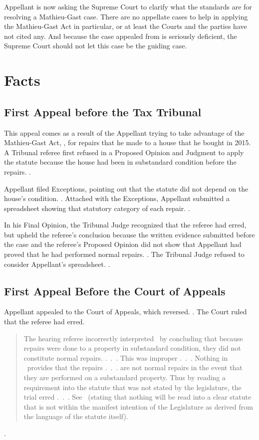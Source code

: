 \documentclass[12pt,\documentclassflag]{michiganCourtOfAppealsBrief}
\begin{document}
Appellant is now asking the Supreme Court to clarify what the standards are for resolving a Mathieu-Gast case. There are no  appellate cases to help in applying the Mathieu-Gast Act in particular, or at least the Courts and the parties have not cited any. And because the case appealed from is seriously deficient, the Supreme Court should not let this case be the guiding case.

\section{Facts}

\subsection{First Appeal before the Tax Tribunal}

This appeal comes as a result of the Appellant trying to take advantage of the Mathieu-Gast Act, \mathieuGast,
for repairs that he made to a house that he bought in 2015. A Tribunal referee first refused in a Proposed Opinion and Judgment to apply the statute because the house had been in substandard condition before the repairs. .

Appellant filed Exceptions, pointing out that the statute did not depend on the house's condition. . Attached with the Exceptions, Appellant submitted a spreadsheet showing that statutory category of each repair. .

In his Final Opinion, the Tribunal Judge recognized that the referee had erred, but upheld the referee's conclusion because the written evidence submitted before the case and the referee's Proposed Opinion did not show that Appellant had proved that he had performed normal repairs. . The Tribunal Judge refused to consider Appellant's spreadsheet. .

\subsection{First Appeal Before the Court of Appeals}

Appellant appealed to the Court of Appeals, which reversed. \cite{Patru I}. The Court ruled that the referee had erred.

\begin{quote}
  The hearing referee incorrectly interpreted \mathieuGast\ by concluding that because repairs were done to a property in substandard condition, they did not constitute normal repairs. .~.~. This was improper .~.~. Nothing in \mathieuGast\ provides that the repairs .~.~. are not normal repairs in the event that they are performed on a substandard property. Thus by reading a requirement into the statute that was not stated by the legislature, the trial erred .~.~. See \ (stating that nothing will be read into a clear statute that is not within the manifest intention of the Legislature as derived from the language of the statute itself).
\end{quote}
.
\end{document}
